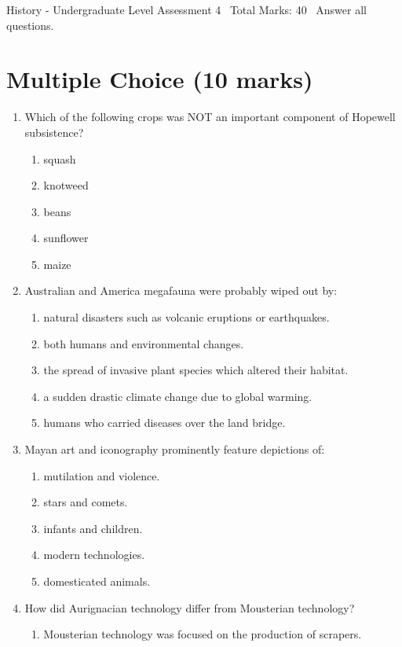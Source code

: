\documentclass[12pt]{article}
\begin{document}
\begin{center}
History - Undergraduate Level Assessment 4 \
Total Marks: 40 \
Answer all questions.
\end{center}

\section*{Multiple Choice (10 marks)}
\begin{enumerate}[label=\arabic*.]
\item Which of the following crops was NOT an important component of Hopewell subsistence?
\begin{enumerate}[label=(\alph*)]
    \item squash
    \item knotweed
    \item beans
    \item sunflower
    \item maize
\end{enumerate}
\item Australian and America megafauna were probably wiped out by:
\begin{enumerate}[label=(\alph*)]
    \item natural disasters such as volcanic eruptions or earthquakes.
    \item both humans and environmental changes.
    \item the spread of invasive plant species which altered their habitat.
    \item a sudden drastic climate change due to global warming.
    \item humans who carried diseases over the land bridge.
\end{enumerate}
\item Mayan art and iconography prominently feature depictions of:
\begin{enumerate}[label=(\alph*)]
    \item mutilation and violence.
    \item stars and comets.
    \item infants and children.
    \item modern technologies.
    \item domesticated animals.
\end{enumerate}
\item How did Aurignacian technology differ from Mousterian technology?
\begin{enumerate}[label=(\alph*)]
    \item Mousterian technology was focused on the production of scrapers.

\end{enumerate}
\end{enumerate}
\end{document}
